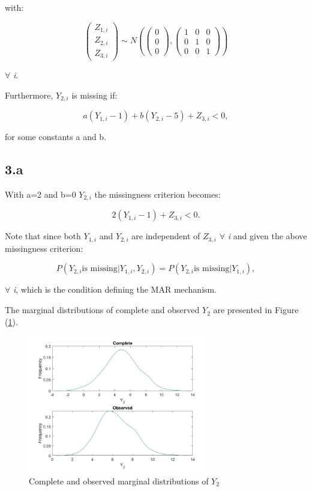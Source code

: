 \documentclass{article}
\begin{document}
with:

\[
\begin{pmatrix}
Z_{1,i} \\
Z_{2,i} \\
Z_{3,i}
\end{pmatrix}{\sim}N\left(\begin{pmatrix}
0 \\
0 \\
0
\end{pmatrix}, \begin{pmatrix}
1 & 0 & 0 \\
0 & 1 & 0 \\
0 & 0 & 1
\end{pmatrix}\right)
\]

$\forall$ \textit{i}.

Furthermore, $Y_{2,i}$ is missing if:

\[
a\left(Y_{1,i}-1\right)+b\left(Y_{2,i}-5\right)+Z_{3,i}<0,
\]

for some constants a and b.

\subsection*{3.a}

With a=2 and b=0 $Y_{2,i}$ the missingness criterion becomes:

\[
2\left(Y_{1,i}-1\right)+Z_{3,i}<0.
\]

Note that since both $Y_{1,i}$ and $Y_{2,i}$ are independent of $Z_{3,i}$ $\forall$ \textit{i} and given the above missingness criterion:

\[
P\left(Y_{2,i} \mbox{is missing}|Y_{1,i},Y_{2,i}\right)=P\left(Y_{2,i} \mbox{is missing}|Y_{1,i}\right),
\]

$\forall$ \textit{i}, which is the condition defining the MAR mechanism.


The marginal distributions of complete and observed $Y_{2}$ are presented in Figure (\ref{Fig_1}).

\begin{figure}[h]
\centering
\caption{Complete and observed marginal distributions of $Y_{2}$}
\label{Fig_1}
\includegraphics[width=8cm]{q3a.jpg}
\end{figure} 
\end{document}
